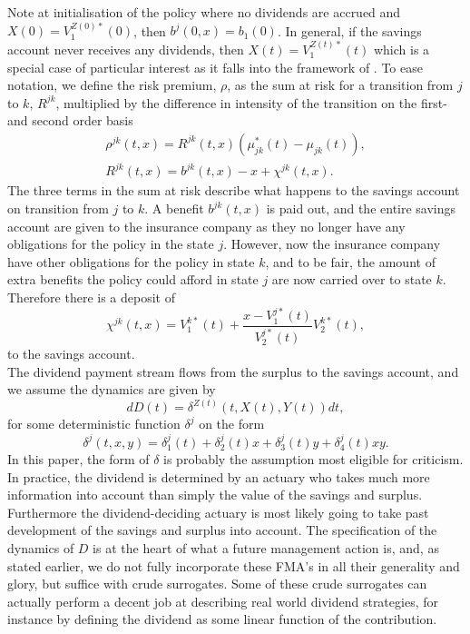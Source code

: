 \documentclass[12pt]{article}
\theoremstyle{my_thm}
\begin{document}
Note at initialisation of the policy where no dividends are accrued and $X(0)=V_1^{Z(0)*}(0)$, then $b^j(0,x)=b_1(0)$. In general, if the savings account never receives any dividends, then $X(t)=V_1^{Z(t)*}(t)$ which is a special case of particular interest as it falls into the framework of \citet{Norberg}. To ease notation, we define the risk premium, $\rho$, as the sum at risk for a transition from $j$ to $k$, $R^{jk}$, multiplied by the difference in intensity of the transition on the first- and second order basis
\begin{gather*}
\rho^{jk}(t,x)=R^{jk}(t,x)(\mu_{jk}^*(t)-\mu_{jk}(t)),
\\
R^{jk}(t,x)=b^{jk}(t,x)-x+\chi^{jk}(t,x).
\end{gather*}
The three terms in the sum at risk describe what happens to the savings account on transition from $j$ to $k$. A benefit $b^{jk}(t,x)$ is paid out, and the entire savings account are given to the insurance company as they no longer have any obligations for the policy in the state $j$. However, now the insurance company have other obligations for the policy in state $k$, and to be fair, the amount of extra benefits the policy could afford in state $j$ are now carried over to state $k$. Therefore there is a deposit of
$$
\chi^{jk}(t,x)=V_1^{k*}(t)+\frac{x-V_1^{j*}(t)}{V_2^{j*}(t)}V_2^{k*}(t),
$$
to the savings account.
\\
The dividend payment stream flows from the surplus to the savings account, and we assume the dynamics are given by
$$
dD(t)=\delta^{Z(t)}(t,X(t),Y(t)) dt,
$$
for some deterministic function $\delta^j$ on the form
\begin{equation*}
\delta^j(t,x,y)=\delta_1^j(t)+\delta_2^j(t)x+\delta_3^j(t)y+\delta_4^j(t)xy.
\end{equation*}
In this paper, the form of $\delta$ is probably the assumption most eligible for criticism. In practice, the dividend is determined by an actuary who takes much more information into account than simply the value of the savings and surplus. Furthermore the dividend-deciding actuary is most likely going to take past development of the savings and surplus into account. The specification of the dynamics of $D$ is at the heart of what a future management action is, and, as stated earlier, we do not fully incorporate these FMA's in all their generality and glory, but suffice with crude surrogates. Some of these crude surrogates can actually perform a decent job at describing real world dividend strategies, for instance by defining the dividend as some linear function of the contribution.
\end{document}
